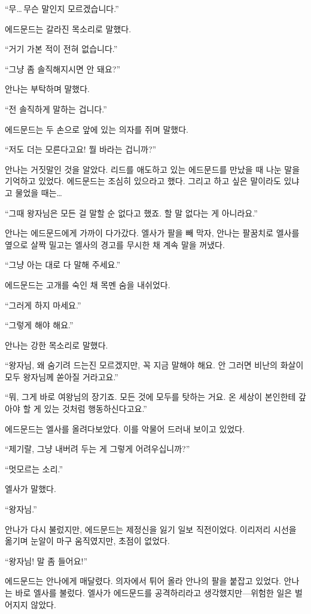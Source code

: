 ``무\ldots\,무슨 말인지 모르겠습니다.''

에드문드는 갈라진 목소리로 말했다.

``거기 가본 적이 전혀 없습니다.''

``그냥 좀 솔직해지시면 안 돼요?''

안나는 부탁하며 말했다.

``전 솔직하게 말하는 겁니다.''

에드문드는 두 손으로 앞에 있는 의자를 쥐며 말했다.

``저도 더는 모른다고요! 뭘 바라는 겁니까?''

안나는 거짓말인 것을 알았다. 리드를 애도하고 있는 에드문드를 만났을 때 나눈 말을 기억하고 있었다. 에드문드는 조심히 있으라고 했다. 그리고 하고 싶은 말이라도 있냐고 물었을 때는\ldots

``그때 왕자님은 모든 걸 말할 순 없다고 했죠. 할 말 없다는 게 아니라요.''

안나는 에드문드에게 가까이 다가갔다. 엘사가 팔을 빼 막자, 안나는 팔꿈치로 엘사를 옆으로 살짝 밀고는 엘사의 경고를 무시한 채 계속 말을 꺼냈다.

``그냥 아는 대로 다 말해 주세요.''

에드문드는 고개를 숙인 채 목멘 숨을 내쉬었다.

``그러게 하지 마세요.''

``그렇게 해야 해요.''

안나는 강한 목소리로 말했다.

``왕자님, 왜 숨기려 드는진 모르겠지만, 꼭 지금 말해야 해요. 안 그러면 비난의 화살이 모두 왕자님께 쏟아질 거라고요.''

``뭐, 그게 바로 여왕님의 장기죠. 모든 것에 모두를 탓하는 거요. 온 세상이 본인한테 갚아야 할 게 있는 것처럼 행동하신다고요.''

에드문드는 엘사를 올려다보았다. 이를 악물어 드러내 보이고 있었다.

``제기랄, 그냥 내버려 두는 게 그렇게 어려우십니까?''

``멋모르는 소리.''

엘사가 말했다.

``왕자님.''

안나가 다시 불렀지만, 에드문드는 제정신을 잃기 일보 직전이었다. 이리저리 시선을 옮기며 눈알이 마구 움직였지만, 초점이 없었다.

``왕자님! 말 좀 들어요!''

에드문드는 안나에게 매달렸다. 의자에서 튀어 올라 안나의 팔을 붙잡고 있었다. 안나는 바로 엘사를 불렀다. 엘사가 에드문드를 공격하리라고 생각했지만—위험한 일은 벌어지지 않았다.

